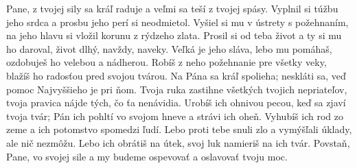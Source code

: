 Pane, z tvojej sily sa kráľ raduje
a veľmi sa teší z tvojej spásy.
\versseparator
Vyplnil si túžbu jeho srdca
a prosbu jeho perí si neodmietol.
\versseparator
Vyšiel si mu v ústrety s požehnaním,
na jeho hlavu si vložil korunu z rýdzeho zlata.
\versseparator
Prosil si od teba život a ty si mu ho daroval,
život dlhý, navždy, naveky.
\versseparator
Veľká je jeho sláva, lebo mu pomáhaš,
ozdobuješ ho velebou a nádherou.
\versseparator
Robíš z neho požehnanie pre všetky veky,
blažíš ho radosťou pred svojou tvárou.
\versseparator
Na Pána sa kráľ spolieha;
neskláti sa, veď pomoc Najvyššieho je pri ňom.
\versseparator
Tvoja ruka zastihne všetkých tvojich nepriateľov,
tvoja pravica nájde tých, čo ťa nenávidia.
\versseparator
Urobíš ich ohnivou pecou, keď sa zjaví tvoja tvár;
Pán ich pohltí vo svojom hneve
a strávi ich oheň.
\versseparator
Vyhubíš ich rod zo zeme
a ich potomstvo spomedzi ľudí.
\versseparator
Lebo proti tebe snuli zlo
a vymýšľali úklady, ale nič nezmôžu.
\versseparator
Lebo ich obrátiš na útek,
svoj luk namieriš na ich tvár.
\versseparator
Povstaň, Pane, vo svojej sile
a my budeme ospevovať a oslavovať tvoju moc.

